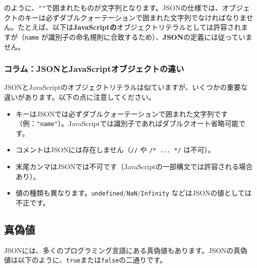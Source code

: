 のように、\texttt{""}で囲まれたものが文字列となります。JSONの仕様では、オブジェクトのキーは必ずダブルクォーテーションで囲まれた文字列でなければなりません。たとえば、以下は\textbf{JavaScriptの}オブジェクトリテラルとしては許容されますが（\texttt{name}
が識別子の命名規則に合致するため）、\textbf{JSON}の定義には従っていません。

\begin{Shaded}
\begin{Highlighting}[]
\NormalTok{\{}
  \OperatorTok{:} \OperatorTok{,}
  \OperatorTok{:}  
\NormalTok{\}}
\end{Highlighting}
\end{Shaded}

\hypertarget{chapter3-ux30b3ux30e9ux30e0jsonux3068javascriptux30aaux30d6ux30b8ux30a7ux30afux30c8ux306eux9055ux3044}{%
\subsubsection{コラム：JSONとJavaScriptオブジェクトの違い}\label{chapter3-ux30b3ux30e9ux30e0jsonux3068javascriptux30aaux30d6ux30b8ux30a7ux30afux30c8ux306eux9055ux3044}}

JSONとJavaScriptのオブジェクトリテラルは似ていますが、いくつかの重要な違いがあります。以下の点に注意してください。

\begin{itemize}
\tightlist
\item
  キーはJSONでは必ずダブルクォーテーションで囲まれた文字列です（例：\texttt{"name"}）。JavaScriptでは識別子であればダブルクオート省略可能です。
\item
  コメントはJSONには存在しません（\texttt{//} や \texttt{/*\ ...\ */}
  は不可）。
\item
  末尾カンマはJSONでは不可です（JavaScriptの一部構文では許容される場合あり）。
\item
  値の種類も異なります。\texttt{undefined}/\texttt{NaN}/\texttt{Infinity}
  などはJSONの値としては不正です。
\end{itemize}

\hypertarget{chapter3-ux771fux507dux5024}{%
\subsection{真偽値}\label{chapter3-ux771fux507dux5024}}

JSONには、多くのプログラミング言語にある真偽値もあります。JSONの真偽値は以下のように、\texttt{true}または\texttt{false}の二通りです。

